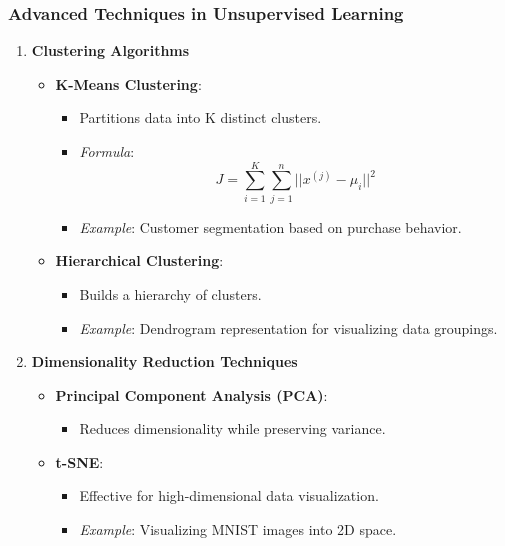 \documentclass[aspectratio=169]{beamer}
\begin{document}
\begin{frame}[fragile]
    \frametitle{Advanced Techniques in Unsupervised Learning}
    \begin{enumerate}
        \item \textbf{Clustering Algorithms}
            \begin{itemize}
                \item \textbf{K-Means Clustering}:
                    \begin{itemize}
                        \item Partitions data into K distinct clusters.
                        \item \textit{Formula}:
                        \begin{equation}
                        J = \sum_{i=1}^{K} \sum_{j=1}^{n} ||x^{(j)} - \mu_i||^2
                        \end{equation}
                        \item \textit{Example}: Customer segmentation based on purchase behavior.
                    \end{itemize}
                \item \textbf{Hierarchical Clustering}:
                    \begin{itemize}
                        \item Builds a hierarchy of clusters.
                        \item \textit{Example}: Dendrogram representation for visualizing data groupings.
                    \end{itemize}
            \end{itemize}
        
        \item \textbf{Dimensionality Reduction Techniques}
            \begin{itemize}
                \item \textbf{Principal Component Analysis (PCA)}: 
                    \begin{itemize}
                        \item Reduces dimensionality while preserving variance.
                    \end{itemize}
                \item \textbf{t-SNE}: 
                    \begin{itemize}
                        \item Effective for high-dimensional data visualization.
                        \item \textit{Example}: Visualizing MNIST images into 2D space.
                    \end{itemize}
            \end{itemize}
    \end{enumerate}
\end{frame}
\end{document}
